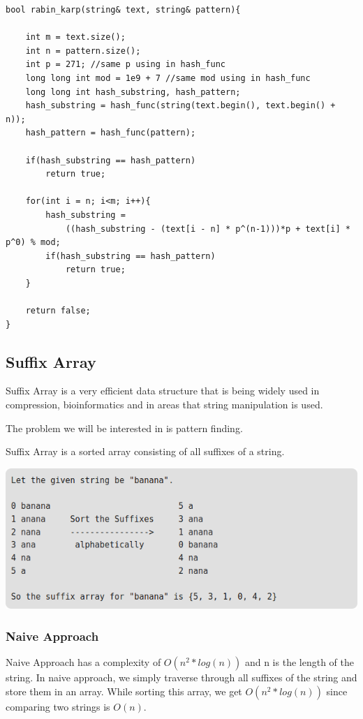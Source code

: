 \documentclass[12pt]{article}
\begin{document}
        \begin{verbatim}
bool rabin_karp(string& text, string& pattern){

    int m = text.size();
    int n = pattern.size();
    int p = 271; //same p using in hash_func
    long long int mod = 1e9 + 7 //same mod using in hash_func
    long long int hash_substring, hash_pattern;
    hash_substring = hash_func(string(text.begin(), text.begin() + n));
    hash_pattern = hash_func(pattern);

    if(hash_substring == hash_pattern)
        return true;

    for(int i = n; i<m; i++){
        hash_substring = 
            ((hash_substring - (text[i - n] * p^(n-1)))*p + text[i] * p^0) % mod;
        if(hash_substring == hash_pattern)
            return true;
    }

    return false;
}
    \end{verbatim}
        
        \subsection{Suffix Array}
        Suffix Array is a very efficient data structure that is being widely used in compression, bioinformatics and in areas that string manipulation is used. 
        
        The problem we will be interested in is pattern finding.
        
        Suffix Array is a sorted array consisting of all suffixes of a string.
        
        \includegraphics[width=\linewidth/2]{suffix_array1.png}
        
        
        \subsubsection{Naive Approach}
        
        Naive Approach has a complexity of $O(n^2 * log(n))$ and n is the length of the string. In naive approach, we simply traverse through all suffixes of the string and store them in an array. While sorting this array, we get $O(n^2 * log(n))$ since comparing two strings is $O(n)$.
        
\end{document}
